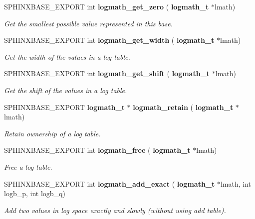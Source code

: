 \begin{DoxyCompactItemize}
\mbox{\label{logmath_8h_a1c160c28a9e7d25923f391773b1028c0}} 
S\+P\+H\+I\+N\+X\+B\+A\+S\+E\+\_\+\+E\+X\+P\+O\+RT int \textbf{ logmath\+\_\+get\+\_\+zero} (\textbf{ logmath\+\_\+t} $\ast$lmath)
\begin{DoxyCompactList}\small\item\em Get the smallest possible value represented in this base. \end{DoxyCompactList}\item 
\mbox{\label{logmath_8h_a0cd690d2a414aebb5e126b8cabbfabde}} 
S\+P\+H\+I\+N\+X\+B\+A\+S\+E\+\_\+\+E\+X\+P\+O\+RT int \textbf{ logmath\+\_\+get\+\_\+width} (\textbf{ logmath\+\_\+t} $\ast$lmath)
\begin{DoxyCompactList}\small\item\em Get the width of the values in a log table. \end{DoxyCompactList}\item 
\mbox{\label{logmath_8h_aed009aca9736612bebdda57444ec63a6}} 
S\+P\+H\+I\+N\+X\+B\+A\+S\+E\+\_\+\+E\+X\+P\+O\+RT int \textbf{ logmath\+\_\+get\+\_\+shift} (\textbf{ logmath\+\_\+t} $\ast$lmath)
\begin{DoxyCompactList}\small\item\em Get the shift of the values in a log table. \end{DoxyCompactList}\item 
S\+P\+H\+I\+N\+X\+B\+A\+S\+E\+\_\+\+E\+X\+P\+O\+RT \textbf{ logmath\+\_\+t} $\ast$ \textbf{ logmath\+\_\+retain} (\textbf{ logmath\+\_\+t} $\ast$lmath)
\begin{DoxyCompactList}\small\item\em Retain ownership of a log table. \end{DoxyCompactList}\item 
S\+P\+H\+I\+N\+X\+B\+A\+S\+E\+\_\+\+E\+X\+P\+O\+RT int \textbf{ logmath\+\_\+free} (\textbf{ logmath\+\_\+t} $\ast$lmath)
\begin{DoxyCompactList}\small\item\em Free a log table. \end{DoxyCompactList}\item 
\mbox{\label{logmath_8h_a61bf79c70a38f00ca060b69b0efd7489}} 
S\+P\+H\+I\+N\+X\+B\+A\+S\+E\+\_\+\+E\+X\+P\+O\+RT int \textbf{ logmath\+\_\+add\+\_\+exact} (\textbf{ logmath\+\_\+t} $\ast$lmath, int logb\+\_\+p, int logb\+\_\+q)
\begin{DoxyCompactList}\small\item\em Add two values in log space exactly and slowly (without using add table). \end{DoxyCompactList}\item 

\end{DoxyCompactItemize}
